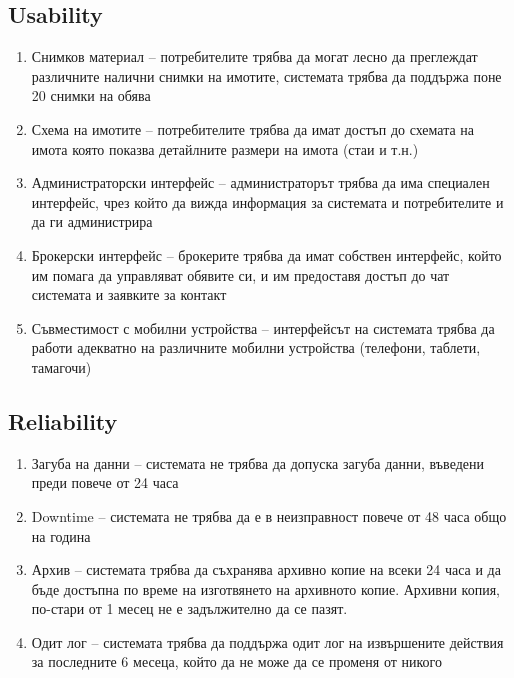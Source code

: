 \documentclass[]{article}
\begin{document}
\subsection{Usability}
\begin{enumerate}
\item Снимков материал -- потребителите трябва да могат лесно да преглеждат различните налични снимки на имотите, системата трябва да поддържа поне 20 снимки на обява
\item Схема на имотите -- потребителите трябва да имат достъп до схемата на имота която показва детайлните размери на имота (стаи и т.н.)
\item Администраторски интерфейс -- администраторът трябва да има специален интерфейс, чрез който да вижда информация за системата и потребителите и да ги администрира
\item Брокерски интерфейс -- брокерите трябва да имат собствен интерфейс, който им помага да управляват обявите си, и им предоставя достъп до чат системата и заявките за контакт
\item Съвместимост с мобилни устройства -- интерфейсът на системата трябва да работи адекватно на различните мобилни устройства (телефони, таблети, тамагочи)
\end{enumerate}

\subsection{Reliability}
\begin{enumerate}
\item Загуба на данни -- системата не трябва да допуска загуба данни, въведени преди повече от 24 часа
\item Downtime -- системата не трябва да е в неизправност повече от 48 часа общо на година
\item Архив -- системата трябва да съхранява архивно копие на всеки 24 часа и да бъде достъпна по време на изготвянето на архивното копие. Архивни копия, по-стари от 1 месец не е задължително да се пазят.
\item Одит лог -- системата трябва да поддържа одит лог на извършените действия за последните 6 месеца, който да не може да се променя от никого
\end{enumerate}
\end{document}
